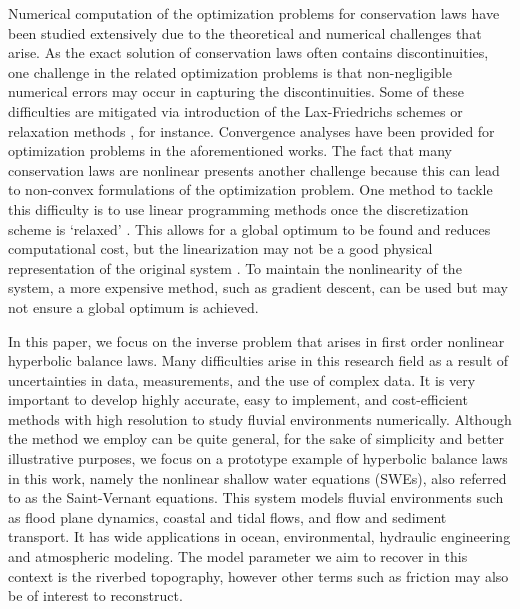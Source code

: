 Numerical computation of the optimization problems for conservation laws have been studied extensively due to the theoretical and numerical challenges that arise. As the exact solution of conservation laws often contains discontinuities, one challenge in the related optimization problems is that non-negligible numerical errors may occur in capturing the discontinuities. Some of these difficulties are mitigated via introduction of the Lax-Friedrichs schemes \cite{Giles2010ConvergenceExtensions} or relaxation methods \cite{Banda2012AdjointLaws}, for instance.
Convergence analyses have been provided for optimization problems in the aforementioned works.
The fact that many conservation laws are nonlinear presents another challenge because this can lead to non-convex formulations of the optimization problem. One method to tackle this difficulty is to use linear programming methods once the discretization scheme is `relaxed' \cite{Gomes2006OptimalModel,Ziliaskopoulos2000LinearProblem}. This allows for a global optimum to be found and reduces computational cost, but the linearization may not be a good physical representation of the original system \cite{Reilly2015Adjoint-BasedMetering}. To maintain the nonlinearity of the system, a more expensive method, such as gradient descent, can be used but may not ensure a global optimum is achieved. 

In this paper, we focus on the inverse problem that arises in first order nonlinear hyperbolic balance laws. Many difficulties arise in this research field as a result of uncertainties in data, measurements, and the use of complex data. It is very important to develop highly accurate, easy to implement, and cost-efficient methods with high resolution to study fluvial environments numerically. Although the method we employ can be quite general, for the sake of simplicity and better illustrative purposes, we focus on a prototype example of hyperbolic balance laws in this work, namely the nonlinear shallow water equations (SWEs), also referred to as the Saint-Vernant equations. This system models fluvial environments such as flood plane dynamics, coastal and tidal flows, and flow and sediment transport. It has wide applications in ocean, environmental, hydraulic engineering and atmospheric modeling. The model parameter we aim to recover in this context is the riverbed topography, however other terms such as friction may also be of interest to reconstruct.

